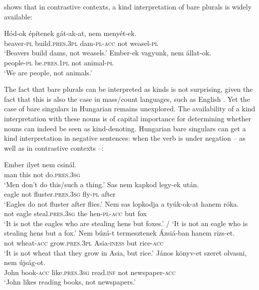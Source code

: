 \documentclass[output=paper]{langscibook}
\begin{document}
\noindent \citet{schvarcz-18} shows that in contrastive contexts, a kind interpretation of bare plurals is widely available:

\ea \label{schv-nem:ex:43}
\gll Hód-ok építenek gát-ak-at, nem menyét-ek.\\
beaver-\textsc{pl} build.\textsc{pres}.\textsc{3pl} dam-\textsc{pl}-\textsc{acc} not  weasel-\textsc{pl}\\
\glt `Beavers build dams, not weasels.' \hfill \citep[p. 116, (50a)]{schvarcz-18}
\ex \label{schv-nem:ex:44}
\gll Ember-ek vagyunk, nem állat-ok.\\
people-\textsc{pl} be.\textsc{pres}.\textsc{1pl} not animal-\textsc{pl}\\
\glt `We are people, not animals.'  \hfill \citep[p. 116, (50c)]{schvarcz-18}
\z

\noindent The fact that bare plurals can be interpreted as kinds is not surprising, given the fact that this is also the case in mass/count languages, such as English \citep{carlson-77}. Yet the case of bare singulars in Hungarian remains unexplored. The availability of a kind interpretation with these nouns is of capital importance for determining whether nouns can indeed be seen as kind-denoting. Hungarian bare singulars can get a kind interpretation in negative sentences: when the verb is under negation -- as well as in contrastive contexts --:

\ea \label{schv-nem:ex:45}
\gll Ember ilyet nem csinál.\\
man this not do.\textsc{pres}.\textsc{3sg}\\
\glt `Men don’t do this/such a thing.' \hfill \citep[p. 115, (49a)]{schvarcz-18}
\ex \label{schv-nem:ex:46}
\gll Sas nem kapkod legy-ek után.\\
eagle not fluster.\textsc{pres}.\textsc{3sg} fly-\textsc{pl}  after\\
\glt `Eagles do not fluster after flies.' \hfill \citep[p. 115, (49b)]{schvarcz-18}
\ex \label{schv-nem:ex:47}
\gll Nem sas lopkodja a tyúk-ok-at hanem róka.\\
not eagle steal.\textsc{pres}.\textsc{3sg} the hen-\textsc{pl}-\textsc{acc} but fox\\
\glt `It is not the eagles who are stealing hens but foxes.' / `It is not an eagle who is stealing hens but a fox.' 
\ex \label{schv-nem:ex:48}
\gll Nem búzá-t termesztenek Ázsiá-ban hanem rizs-et.\\
not wheat-\textsc{acc} grow.\textsc{pres}.\textsc{3pl} Asia-\textsc{iness} but rice-\textsc{acc}\\
\glt `It is not wheat that they grow in Asia, but rice.' 
\ex \label{schv-nem:ex:49}
\gll  János könyv-et szeret olvasni, nem újság-ot. \\
John book-\textsc{acc} like.\textsc{pres}.\textsc{3sg} read.\textsc{inf} not newspaper-\textsc{acc}\\
\glt `John likes reading books, not newspapers.' 
\z
\end{document}

